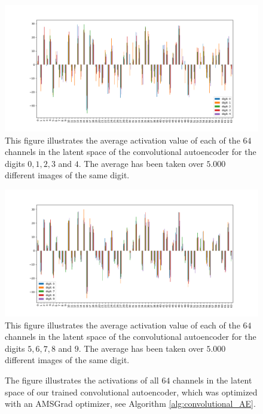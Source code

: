 \begin{figure}
\begin{center}
   \begin{minipage}[b]{\linewidth}
      \includegraphics[width=\linewidth]{convolutional_AE_latent_0}
      This figure illustrates the average activation value of each of the $64$ channels in the latent space of the convolutional autoencoder for the digits $0, 1, 2, 3$ and  $4$. The average has been taken over $5.000$ different images of the same digit.
	\end{minipage}
   \begin{minipage}[b]{\linewidth}
      \includegraphics[width=\linewidth]{convolutional_AE_latent_1}
      This figure illustrates the average activation value of each of the $64$ channels in the latent space of the convolutional autoencoder for the digits $5, 6, 7, 8$ and $9$. The average has been taken over $5.000$ different images of the same digit.
	\end{minipage}
\end{center}
\caption{The figure illustrates the activations of all $64$ channels in the latent space of our trained convolutional autoencoder, which was optimized with an AMSGrad optimizer, see Algorithm \ref{alg:convolutional_AE}.}\label{fig:convolutional_AE_latent}
\end{figure}

